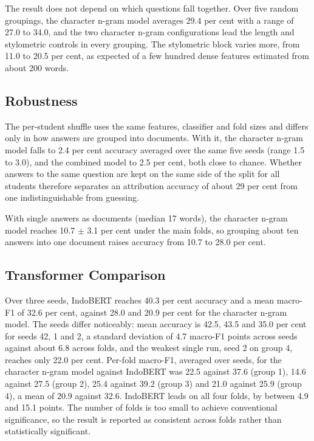 \documentclass[runningheads]{llncs}
\begin{document}
The result does not depend on which questions fall together. Over five random groupings, the character n-gram model averages 29.4 per cent with a range of 27.0 to 34.0, and the two character n-gram configurations lead the length and stylometric controls in every grouping. The stylometric block varies more, from 11.0 to 20.5 per cent, as expected of a few hundred dense features estimated from about 200 words.

\subsection{Robustness}

The per-student shuffle uses the same features, classifier and fold sizes and differs only in how answers are grouped into documents. With it, the character n-gram model falls to 2.4 per cent accuracy averaged over the same five seeds (range 1.5 to 3.0), and the combined model to 2.5 per cent, both close to chance. Whether answers to the same question are kept on the same side of the split for all students therefore separates an attribution accuracy of about 29 per cent from one indistinguishable from guessing.

With single answers as documents (median 17 words), the character n-gram model reaches 10.7 $\pm$ 3.1 per cent under the main folds, so grouping about ten answers into one document raises accuracy from 10.7 to 28.0 per cent.

\subsection{Transformer Comparison}

Over three seeds, IndoBERT reaches 40.3 per cent accuracy and a mean macro-F1 of 32.6 per cent, against 28.0 and 20.9 per cent for the character n-gram model. The seeds differ noticeably: mean accuracy is 42.5, 43.5 and 35.0 per cent for seeds 42, 1 and 2, a standard deviation of 4.7 macro-F1 points across seeds against about 6.8 across folds, and the weakest single run, seed 2 on group 4, reaches only 22.0 per cent. Per-fold macro-F1, averaged over seeds, for the character n-gram model against IndoBERT was 22.5 against 37.6 (group 1), 14.6 against 27.5 (group 2), 25.4 against 39.2 (group 3) and 21.0 against 25.9 (group 4), a mean of 20.9 against 32.6. IndoBERT leads on all four folds, by between 4.9 and 15.1 points. The number of folds is too small to achieve conventional significance, so the result is reported as consistent across folds rather than statistically significant.
\end{document}
